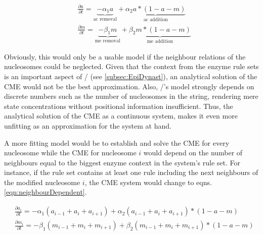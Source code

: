             \begin{subequations}
                \begin{align}
                    &\frac{\partial a}{\partial t} = \underbrace{- \alpha_1 a }_{\textrm{ac removal}} + \underbrace{ \alpha_2 a*(1-a-m) }_{\textrm{ac addition}}\\
                    &\frac{\partial m}{\partial t} = \underbrace{- \beta_1 m }_{\textrm{me removal}} + \underbrace{ \beta_2 m*(1-a-m) }_{\textrm{me addition}}
                \end{align}
                \label{eqn:noncooperative}
            \end{subequations}

            Obviously, this would only be a usable model if the neighbour relations of the nucleosomes could be neglected. Given that the context from the enzyme rule sets is an important aspect of \ed/ (see \ref{subsec:EpiDynast}), an analytical solution of the CME would not be the best approximation. Also, \ed/'s model strongly depends on discrete numbers such as the number of nucleosomes in the string, rendering mere state concentrations without positional information insufficient. Thus, the analytical solution of the CME as a continuous system, makes it even more unfitting as an approximation for the system at hand.

            A more fitting model would be to establish and solve the CME for every nucleosome while the CME for nucleosome $i$ would depend on the number of neighbours equal to the biggest enzyme context in the system's rule set. For instance, if the rule set contains at least one rule including the next neighbours of the modified nucleosome $i$, the CME system would change to eqns. \ref{eqn:neighbourDependent}.

            \begin{subequations}
                \begin{align}
                    &\frac{\partial a_i}{\partial t} = - \alpha_1 (a_{i-1} + a_i + a_{i+1}) + \alpha_2 (a_{i-1} + a_i + a_{i+1})*(1-a-m)\\
                    &\frac{\partial m_i}{\partial t} = - \beta_1 (m_{i-1} + m_i + m_{i+1}) + \beta_2 (m_{i-1} + m_i + m_{i+1})*(1-a-m)
                \end{align}
                \label{eqn:neighbourDependent}
            \end{subequations}

